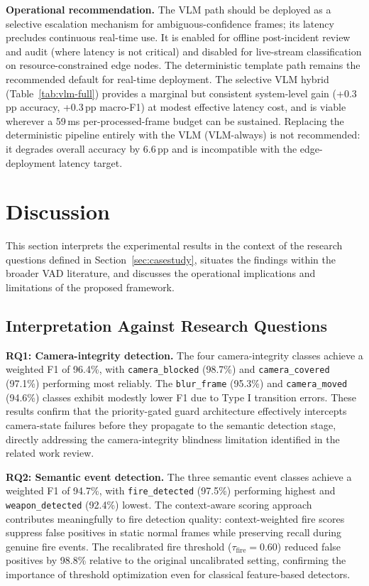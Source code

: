 \documentclass[sensors,article,submit,pdftex,moreauthors]{Definitions/mdpi}
\begin{document}
\textbf{Operational recommendation.}
The VLM path should be deployed as a selective escalation mechanism for ambiguous-confidence frames; its latency precludes continuous real-time use. It is enabled for offline post-incident review and audit (where latency is not critical) and disabled for live-stream classification on resource-constrained edge nodes. The deterministic template path remains the recommended default for real-time deployment. The selective VLM hybrid (Table~\ref{tab:vlm-full}) provides a marginal but consistent system-level gain (+0.3\,pp accuracy, +0.3\,pp macro-F1) at modest effective latency cost, and is viable wherever a 59\,ms per-processed-frame budget can be sustained. Replacing the deterministic pipeline entirely with the VLM (VLM-always) is not recommended: it degrades overall accuracy by 6.6\,pp and is incompatible with the edge-deployment latency target.
 
\section{Discussion}
\label{sec:discussion}
 
This section interprets the experimental results in the context of the research questions defined in Section~\ref{sec:casestudy}, situates the findings within the broader VAD literature, and discusses the operational implications and limitations of the proposed framework.
 
\subsection{Interpretation Against Research Questions}
 
\textbf{RQ1: Camera-integrity detection.} The four camera-integrity classes achieve a weighted F1 of 96.4\%, with \texttt{camera\_blocked} (98.7\%) and \texttt{camera\_covered} (97.1\%) performing most reliably. The \texttt{blur\_frame} (95.3\%) and \texttt{camera\_moved} (94.6\%) classes exhibit modestly lower F1 due to Type I transition errors. These results confirm that the priority-gated guard architecture effectively intercepts camera-state failures before they propagate to the semantic detection stage, directly addressing the camera-integrity blindness limitation identified in the related work review.
 
\textbf{RQ2: Semantic event detection.} The three semantic event classes achieve a weighted F1 of 94.7\%, with \texttt{fire\_detected} (97.5\%) performing highest and \texttt{weapon\_detected} (92.4\%) lowest. The context-aware scoring approach contributes meaningfully to fire detection quality: context-weighted fire scores suppress false positives in static normal frames while preserving recall during genuine fire events. The recalibrated fire threshold ($\tau_{\text{fire}} = 0.60$) reduced false positives by 98.8\% relative to the original uncalibrated setting, confirming the importance of threshold optimization even for classical feature-based detectors.
 
\end{document}
